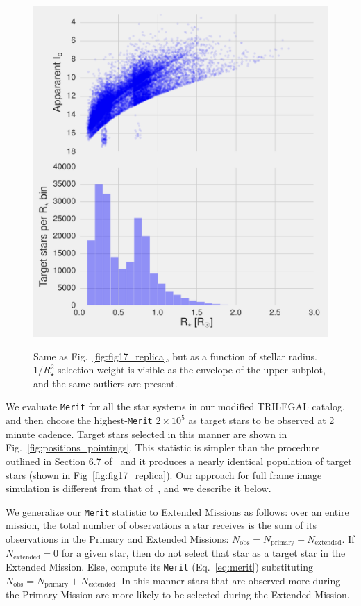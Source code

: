 \begin{figure}[!tb]
	\includegraphics{figures/fig17_radius_on_x.pdf}
	\label{fig:fig17_radius_on_x}
	\caption{Same as Fig.~\protect\ref{fig:fig17_replica}, but as a function of 
	stellar radius. $1/R_\star^2$ selection weight is visible as the envelope 
	of the upper subplot, and the same outliers are present.
	}
\end{figure}


We evaluate \texttt{Merit} for all the star systems in our modified
TRILEGAL catalog, and then choose the highest-\texttt{Merit} 
$2\times10^5$ as target
stars to be observed at 2 minute cadence.  Target stars selected in
this manner are shown in Fig.~\ref{fig:positions_pointings}. 
This statistic is simpler than the procedure outlined in Section 6.7
of~ and it produces a nearly identical
population of target stars (shown in Fig~\ref{fig:fig17_replica}).
Our approach for full frame image simulation is different from that
of~, and we describe it below.

We generalize our \texttt{Merit} statistic to Extended Missions as 
follows: over an
entire mission, the total number of observations a star receives is
the sum of its observations in the Primary and Extended Missions:
$N_\text{obs}=N_\text{primary}+N_\text{extended}$.  If
$N_\text{extended}=0$ for a given star, then do not select that star as a
target star in the Extended Mission.  Else, compute its \texttt{Merit}
(Eq.~\ref{eq:merit}) substituting
$N_\text{obs}=N_\text{primary}+N_\text{extended}$.  In this manner
stars that are observed more during the Primary Mission are more
likely to be selected during the Extended Mission.
 

